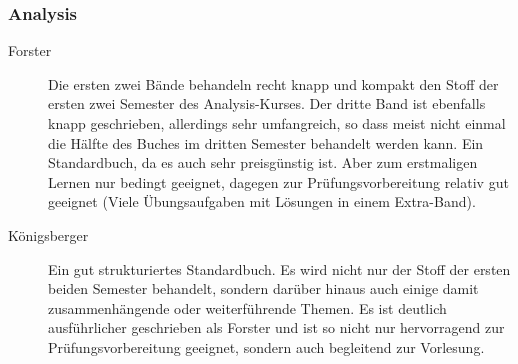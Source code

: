 \subsubsection{Analysis}
\begin{description}

\item[Forster] {Die ersten zwei
Bände behandeln recht knapp und kompakt den Stoff der ersten
zwei Semester des Analysis-Kurses. Der dritte Band ist ebenfalls
knapp geschrieben, allerdings sehr umfangreich, so dass meist
nicht einmal die Hälfte des Buches im dritten Semester behandelt
werden kann. Ein Standardbuch, da es auch sehr preisgünstig ist.
Aber zum erstmaligen Lernen nur bedingt geeignet,
dagegen zur Prüfungsvorbereitung relativ gut geeignet (Viele
Übungsaufgaben mit Lösungen in einem Extra-Band).}


\item[Königsberger]{
Ein gut strukturiertes Standardbuch. Es wird nicht nur der Stoff der
ersten beiden Semester behandelt, sondern darüber hinaus auch einige
damit zusammenhängende oder weiterführende Themen. Es ist
deutlich ausführlicher geschrieben als Forster und ist so nicht nur
hervorragend zur Prüfungsvorbereitung geeignet, sondern auch
begleitend zur Vorlesung.}




\end{description}
